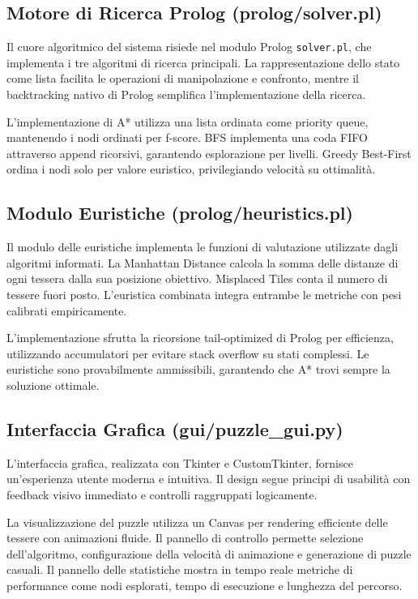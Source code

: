 \documentclass[12pt,a4paper]{report}
\theoremstyle{definition}
\begin{document}
\subsection{Motore di Ricerca Prolog (prolog/solver.pl)}

Il cuore algoritmico del sistema risiede nel modulo Prolog \texttt{solver.pl}, che implementa i tre algoritmi di ricerca principali. La rappresentazione dello stato come lista facilita le operazioni di manipolazione e confronto, mentre il backtracking nativo di Prolog semplifica l'implementazione della ricerca.

L'implementazione di A* utilizza una lista ordinata come priority queue, mantenendo i nodi ordinati per f-score. BFS implementa una coda FIFO attraverso append ricorsivi, garantendo esplorazione per livelli. Greedy Best-First ordina i nodi solo per valore euristico, privilegiando velocità su ottimalità.

\subsection{Modulo Euristiche (prolog/heuristics.pl)}

Il modulo delle euristiche implementa le funzioni di valutazione utilizzate dagli algoritmi informati. La Manhattan Distance calcola la somma delle distanze di ogni tessera dalla sua posizione obiettivo. Misplaced Tiles conta il numero di tessere fuori posto. L'euristica combinata integra entrambe le metriche con pesi calibrati empiricamente.

L'implementazione sfrutta la ricorsione tail-optimized di Prolog per efficienza, utilizzando accumulatori per evitare stack overflow su stati complessi. Le euristiche sono provabilmente ammissibili, garantendo che A* trovi sempre la soluzione ottimale.

\subsection{Interfaccia Grafica (gui/puzzle\_gui.py)}

L'interfaccia grafica, realizzata con Tkinter e CustomTkinter, fornisce un'esperienza utente moderna e intuitiva. Il design segue principi di usabilità con feedback visivo immediato e controlli raggruppati logicamente.

La visualizzazione del puzzle utilizza un Canvas per rendering efficiente delle tessere con animazioni fluide. Il pannello di controllo permette selezione dell'algoritmo, configurazione della velocità di animazione e generazione di puzzle casuali. Il pannello delle statistiche mostra in tempo reale metriche di performance come nodi esplorati, tempo di esecuzione e lunghezza del percorso.
\end{document}
